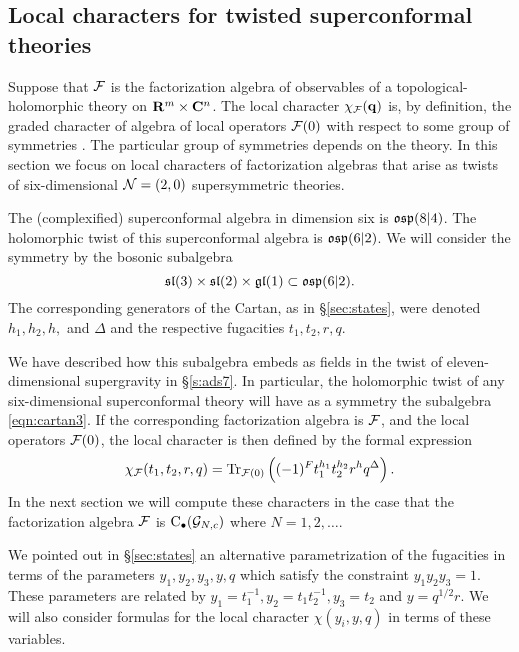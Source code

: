\documentclass[../main.tex]{subfiles}
\begin{document}
 


\subsection{Local characters for twisted superconformal theories}\label{s:localchar}

Suppose that $\mathcal{F}$ is the factorization algebra of observables of a topological-holomorphic theory on $\mathbf{R}^m \times \mathbf{C}^n$. 
The local character $\chi_{\mathcal{F}} ({\bf q})$ is, by definition, the graded character of algebra of local operators $\mathcal{F}(0)$ with respect to some group of symmetries \cite{SWchar}.
The particular group of symmetries depends on the theory.
In this section we focus on local characters of factorization algebras that arise as twists of six-dimensional $\mathcal{N}=(2,0)$ supersymmetric theories.

The (complexified) superconformal algebra in dimension six is $\mathfrak{osp}(8|4)$. 
The holomorphic twist of this superconformal algebra is $\mathfrak{osp}(6|2)$. 
We will consider the symmetry by the bosonic subalgebra
\begin{equation}\label{eqn:cartan3}
\mathfrak{sl}(3) \times \mathfrak{sl}(2) \times \mathfrak{gl}(1) \subset \mathfrak{osp}(6|2)  .
\end{equation}
The corresponding generators of the Cartan, as in \S \ref{sec:states}, were denoted $h_1,h_2,h,$ and $\Delta$ and the respective fugacities $t_1,t_2,r,q$.

We have described how this subalgebra embeds as fields in the twist of eleven-dimensional supergravity in \S \ref{s:ads7}. 
In particular, the holomorphic twist of any six-dimensional superconformal theory will have as a symmetry the subalgebra \eqref{eqn:cartan3}.
If the corresponding factorization algebra is $\mathcal{F}$, and the local operators $\mathcal{F}(0)$, the local character is then defined by the formal expression
\begin{equation}
\chi_{\mathcal{F}}(t_1,t_2,r,q) = {\rm Tr}_{\mathcal{F}(0)} \left((-1)^F t_1^{h_1} t_2^{h_2} r^h q^\Delta\right) .
\end{equation}
In the next section we will compute these characters in the case that the factorization algebra $\mathcal{F}$ is ${\mathrm{C}}_\bullet(\mathcal{G}_{N,c})$ where $N = 1,2,\ldots$.

We pointed out in \S \ref{sec:states} an alternative parametrization of the fugacities in terms of the parameters $y_1,y_2,y_3,y,q$ which satisfy the constraint $y_1 y_2 y_3 = 1$.
These parameters are related by $y_1=t_1^{-1}, y_2 = t_1 t_2^{-1}, y_3 = t_2$ and $y = q^{1/2} r$. 
We will also consider formulas for the local character $\chi(y_i,y,q)$ in terms of these variables.
  
\end{document}
